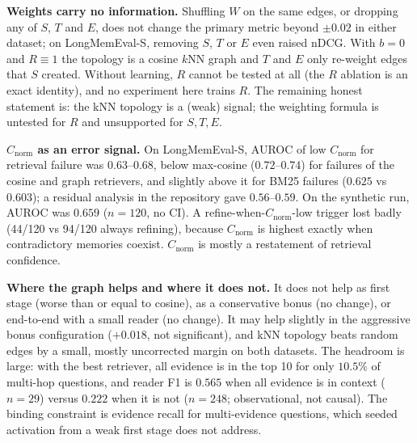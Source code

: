 \documentclass[10pt]{article}
\newcommand{\cn}{C_{\mathrm{norm}}}
\begin{document}
\textbf{Weights carry no information.} Shuffling $W$ on the same edges, or dropping any of $S$, $T$ and $E$, does not change the primary metric beyond $\pm0.02$ in either dataset; on LongMemEval-S, removing $S$, $T$ or $E$ even raised nDCG. With $b=0$ and $R\equiv1$ the topology is a cosine $k$NN graph and $T$ and $E$ only re-weight edges that $S$ created. Without learning, $R$ cannot be tested at all (the $R$ ablation is an exact identity), and no experiment here trains $R$. The remaining honest statement is: the kNN topology is a (weak) signal; the weighting formula is untested for $R$ and unsupported for $S,T,E$.

\textbf{$\cn$ as an error signal.} On LongMemEval-S, AUROC of low $\cn$ for retrieval failure was $0.63$--$0.68$, below max-cosine ($0.72$--$0.74$) for failures of the cosine and graph retrievers, and slightly above it for BM25 failures ($0.625$ vs $0.603$); a residual analysis in the repository gave $0.56$--$0.59$. On the synthetic run, AUROC was $0.659$ ($n=120$, no CI). A refine-when-$\cn$-low trigger lost badly (44/120 vs 94/120 always refining), because $\cn$ is highest exactly when contradictory memories coexist. $\cn$ is mostly a restatement of retrieval confidence.

\textbf{Where the graph helps and where it does not.} It does not help as first stage (worse than or equal to cosine), as a conservative bonus (no change), or end-to-end with a small reader (no change). It may help slightly in the aggressive bonus configuration ($+0.018$, not significant), and kNN topology beats random edges by a small, mostly uncorrected margin on both datasets. The headroom is large: with the best retriever, all evidence is in the top 10 for only $10.5\%$ of multi-hop questions, and reader F1 is $0.565$ when all evidence is in context ($n=29$) versus $0.222$ when it is not ($n=248$; observational, not causal). The binding constraint is evidence recall for multi-evidence questions, which seeded activation from a weak first stage does not address.
\end{document}
